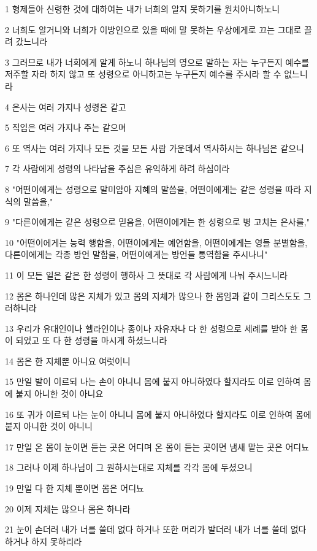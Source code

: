 \par 1 형제들아 신령한 것에 대하여는 내가 너희의 알지 못하기를 원치아니하노니
\par 2 너희도 알거니와 너희가 이방인으로 있을 때에 말 못하는 우상에게로 끄는 그대로 끌려 갔느니라
\par 3 그러므로 내가 너희에게 알게 하노니 하나님의 영으로 말하는 자는 누구든지 예수를 저주할 자라 하지 않고 또 성령으로 아니하고는 누구든지 예수를 주시라 할 수 없느니라
\par 4 은사는 여러 가지나 성령은 같고
\par 5 직임은 여러 가지나 주는 같으며
\par 6 또 역사는 여러 가지나 모든 것을 모든 사람 가운데서 역사하시는 하나님은 같으니
\par 7 각 사람에게 성령의 나타남을 주심은 유익하게 하려 하심이라
\par 8 "어떤이에게는 성령으로 말미암아 지혜의 말씀을, 어떤이에게는 같은 성령을 따라 지식의 말씀을,"
\par 9 "다른이에게는 같은 성령으로 믿음을, 어떤이에게는 한 성령으로 병 고치는 은사를,"
\par 10 "어떤이에게는 능력 행함을, 어떤이에게는 예언함을, 어떤이에게는 영들 분별함을, 다른이에게는 각종 방언 말함을, 어떤이에게는 방언들 통역함을 주시나니"
\par 11 이 모든 일은 같은 한 성령이 행하사 그 뜻대로 각 사람에게 나눠 주시느니라
\par 12 몸은 하나인데 많은 지체가 있고 몸의 지체가 많으나 한 몸임과 같이 그리스도도 그러하니라
\par 13 우리가 유대인이나 헬라인이나 종이나 자유자나 다 한 성령으로 세례를 받아 한 몸이 되었고 또 다 한 성령을 마시게 하셨느니라
\par 14 몸은 한 지체뿐 아니요 여럿이니
\par 15 만일 발이 이르되 나는 손이 아니니 몸에 붙지 아니하였다 할지라도 이로 인하여 몸에 붙지 아니한 것이 아니요
\par 16 또 귀가 이르되 나는 눈이 아니니 몸에 붙지 아니하였다 할지라도 이로 인하여 몸에 붙지 아니한 것이 아니니
\par 17 만일 온 몸이 눈이면 듣는 곳은 어디며 온 몸이 듣는 곳이면 냄새 맡는 곳은 어디뇨
\par 18 그러나 이제 하나님이 그 원하시는대로 지체를 각각 몸에 두셨으니
\par 19 만일 다 한 지체 뿐이면 몸은 어디뇨
\par 20 이제 지체는 많으나 몸은 하나라
\par 21 눈이 손더러 내가 너를 쓸데 없다 하거나 또한 머리가 발더러 내가 너를 쓸데 없다 하거나 하지 못하리라
